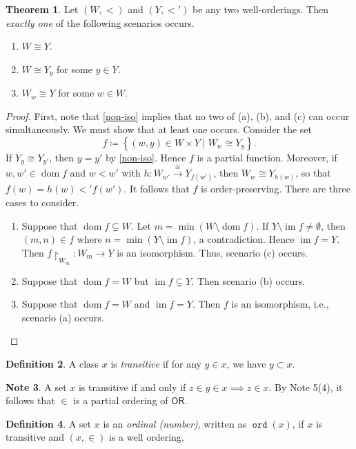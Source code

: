 \documentclass[10pt,letterpaper,cm]{nupset}
\theoremstyle{definition}
\newtheorem{definition}{Definition}[subsection]
\newtheorem{note}[definition]{Note}
\theoremstyle{theorem}
\newtheorem{theorem}[definition]{Theorem}
\theoremstyle{remark}
\newcommand{\1}{\mathbf{1}}
\newcommand{\0}{\vec 0}
\newcommand{\ord}{\mathsf{OR}}
\DeclareMathOperator{\im}{im}
\DeclareMathOperator{\dom}{dom}
\DeclareMathOperator{\od}{\mathtt{ord}}
\begin{document}
\begin{theorem}
Let $(W, <)$ and $(Y, <')$ be any two well-orderings.  Then \emph{exactly one} of the following scenarios occurs. 
\begin{enumerate}[label=(\alph*)]
\item $W \cong Y$.
\item $W \cong  Y_y$ for some $y\in Y$.
\item $W_w \cong Y$ for some $w\in W$.
\end{enumerate}
\end{theorem}
\begin{proof}
First, note that \cref{non-iso} implies that no two of (a), (b), and (c) can occur simultaneously. We must show that at least one occurs. Consider the set $$ f \coloneqq \left\{(w,y) \in W\times Y \mid W_w \cong Y_y\right\}  .$$ If $Y_y \cong Y_{y'}$, then $y = y'$ by \cref{non-iso}. Hence $f$ is a partial function. Moreover,  if $w,w'\in \dom{f}$ and $w<w'$ with $h : W_{w'} \overset{\cong}{\longrightarrow} Y_{f(w')}$, then $W_w \cong Y_{h(w)}$, so that $f(w) = h(w)<' f(w')$. It follows that $f$ is order-preserving. 
There are three cases to consider.
\begin{enumerate}[label=(\roman*)]
\item Suppose that $\dom{f} \subsetneq W$. Let $m = \min(W \setminus \dom{f})$. If $Y \setminus \im{f} \ne \emptyset$, then $(m, n) \in f$ where $n = \min(Y \setminus \im{f})$, a contradiction. Hence $\im{f} = Y$. Then $f\restriction_{W_m} : W_m \to Y$ is an isomorphism. Thus, scenario (c) occurs.
\item Suppose that $\dom{f} = W$ but $\im{f} \subsetneq Y$. Then scenario (b) occurs.
\item Suppose that $\dom{f} = W$ and $\im{f} = Y$. Then $f$ is an isomorphism, i.e., scenario (a) occurs.
\end{enumerate}
\end{proof}

\begin{definition}
A class $x$ is \textit{transitive} if for any $y\in x$, we have $y\subset x$.
\end{definition}

\begin{note}
A set $x$ is transitive if and only if $z \in y \in x \implies z\in x$. By Note 5(4), it follows that $\in$ is a partial ordering of $\ord$.
\end{note}

\begin{definition}
A set $x$ is an \textit{ordinal (number)}, written as $\od(x)$, if $x$ is transitive and $(x, \in)$ is a well ordering. 
\end{definition}
\end{document}
